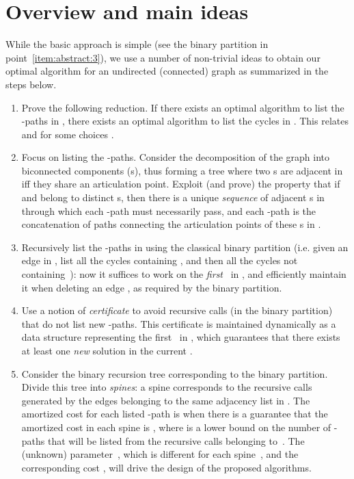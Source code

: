 \section{Overview and main ideas}
\label{sec:overview}

While the basic approach is simple (see the binary partition in
  point~\ref{item:abstract:3}), we use a number of non-trivial ideas to
  obtain our optimal algorithm for an undirected (connected) graph 
  as summarized in the steps below.
  \begin{enumerate}
  \item Prove the following reduction. If there exists an optimal
    algorithm to list the -paths in , there exists an optimal
    algorithm to list the cycles in . This relates
     and  for some choices .



  \item Focus on listing the -paths. Consider the decomposition of
    the graph into biconnected components ({\bcc}s), thus forming a
    tree  where two {\bcc}s are adjacent in  iff they share an
    articulation point. Exploit (and prove) the property that if 
    and  belong to distinct {\bcc}s, then  there is a unique
    \emph{sequence}  of adjacent {\bcc}s in  through
    which each -path must necessarily pass, and  each
    -path is the concatenation of paths connecting the
    articulation points of these {\bcc}s in .

  \item \label{item:abstract:3} Recursively list the -paths in
     using the classical binary partition (i.e.\mbox{}
    given an edge  in , list all the cycles containing
    , and then all the cycles not containing~): now it suffices to
    work on the \emph{first} \bcc\ in , and efficiently
    maintain it when deleting an edge , as required by the binary
    partition.

  \item Use a notion of \emph{certificate} to avoid recursive calls
    (in the binary partition) that do not list new -paths.  This
    certificate is maintained dynamically as a data structure
    representing the first \bcc\ in , which guarantees
    that there exists at least one \emph{new} solution in the current
    .

  \item Consider the binary recursion tree corresponding to the binary
    partition.  Divide this tree into \emph{spines}: a spine
    corresponds to the recursive calls generated by the edges 
    belonging to the same adjacency list in .  The
    amortized cost for each listed -path  is  when
    there is a guarantee that the amortized cost in each spine  is
    , where  is a lower bound on the number of -paths
    that will be listed from the recursive calls belonging to~. The
    (unknown) parameter~, which is different for each spine~, and the
    corresponding cost , will drive the design of the proposed
    algorithms.
  \end{enumerate}

